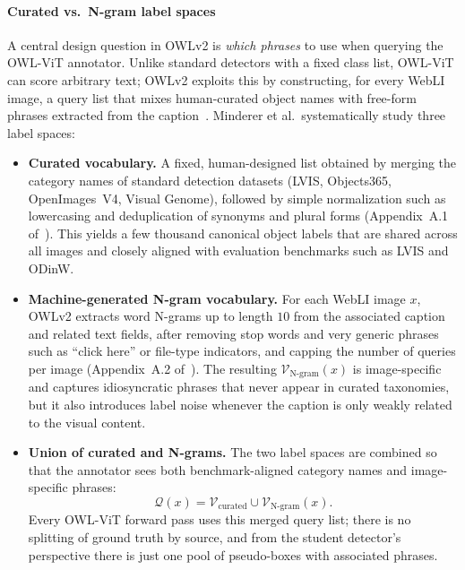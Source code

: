 \begin{enrichment}
\begin{enrichment}
		\paragraph{Curated vs.\ N-gram label spaces}
		A central design question in OWLv2 is \emph{which phrases} to use when querying the OWL-ViT annotator.
		Unlike standard detectors with a fixed class list, OWL-ViT can score arbitrary text; OWLv2 exploits this by constructing, for every WebLI image, a query list that mixes human-curated object names with free-form phrases extracted from the caption~\cite{minderer2024_owlvitv2}.
		Minderer et al.\ systematically study three label spaces:
		\begin{itemize}
			\item \textbf{Curated vocabulary.}
			A fixed, human-designed list obtained by merging the category names of standard detection datasets (LVIS, Objects365, OpenImages~V4, Visual Genome), followed by simple normalization such as lowercasing and deduplication of synonyms and plural forms (Appendix~A.1 of~\cite{minderer2024_owlvitv2}).
			This yields a few thousand canonical object labels that are shared across all images and closely aligned with evaluation benchmarks such as LVIS and ODinW.
			
			\item \textbf{Machine-generated N-gram vocabulary.}
			For each WebLI image $x$, OWLv2 extracts word N-grams up to length $10$ from the associated caption and related text fields, after removing stop words and very generic phrases such as ``click here'' or file-type indicators, and capping the number of queries per image (Appendix~A.2 of~\cite{minderer2024_owlvitv2}).
			The resulting $\mathcal{V}_{\text{N-gram}}(x)$ is image-specific and captures idiosyncratic phrases that never appear in curated taxonomies, but it also introduces label noise whenever the caption is only weakly related to the visual content.
			
			\item \textbf{Union of curated and N-grams.}
			The two label spaces are combined so that the annotator sees both benchmark-aligned category names and image-specific phrases:
			\[
			\mathcal{Q}(x) = \mathcal{V}_{\text{curated}} \cup \mathcal{V}_{\text{N-gram}}(x).
			\]
			Every OWL-ViT forward pass uses this merged query list; there is no splitting of ground truth by source, and from the student detector's perspective there is just one pool of pseudo-boxes with associated phrases.
		\end{itemize}
		

\end{enrichment}
\end{enrichment}
